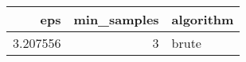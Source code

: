 \begin{tabular}{rrl}
\toprule
eps & min_samples & algorithm \\
\midrule
3.207556 & 3 & brute \\
\bottomrule
\end{tabular}
